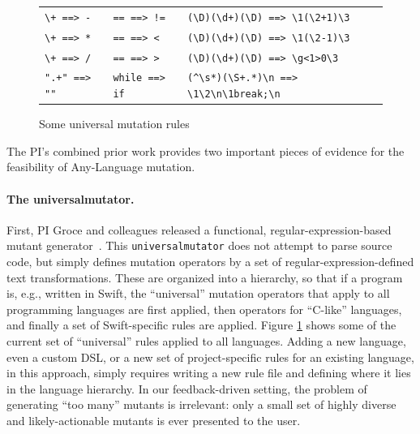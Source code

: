 \begin{figure}
\begin{tabularx}{0.75\textwidth}{XXX}
\verb|\+ ==> -| & \verb|== ==> !=| & \verb|(\D)(\d+)(\D) ==> \1(\2+1)\3|\\
\verb|\+ ==> *| & \verb|== ==> <| & \verb|(\D)(\d+)(\D) ==> \1(\2-1)\3|\\
\verb|\+ ==> /| & \verb|== ==> >| & \verb|(\D)(\d+)(\D) ==> \g<1>0\3|\\
\verb|".+" ==> ""| & \verb|while ==> if| & \verb|(^\s*)(\S+.*)\n ==> \1\2\n\1break;\n|\\
\end{tabularx}
\caption{Some universal mutation rules}
\label{fig:rules}
\end{figure}

The PI's combined prior work provides two important pieces of evidence for the
feasibility of Any-Language mutation.  

\paragraph{The universalmutator.} First, PI Groce and colleagues
released a functional, regular-expression-based mutant
generator~\cite{regexpMut,universalmutator}.
This {\tt universalmutator} 
does not attempt to parse source code, but simply defines mutation
operators by a set of regular-expression-defined text transformations.  These
are organized into a hierarchy, so that if a program is, e.g., written in Swift,
the ``universal'' mutation operators that apply to all programming languages are
first applied, then operators for ``C-like'' languages, and finally a set of
Swift-specific rules are applied.  Figure \ref{fig:rules} shows some of the
current set of ``universal'' rules applied to all languages.  Adding a new
language, even a custom DSL, or a new set of project-specific rules for an
existing language, in this approach, simply requires writing a new rule file and
defining where it lies in the language hierarchy.  In our feedback-driven
setting, the problem of generating ``too many'' mutants is irrelevant: only a
small set of highly diverse and likely-actionable mutants is ever presented to
the
user. %

